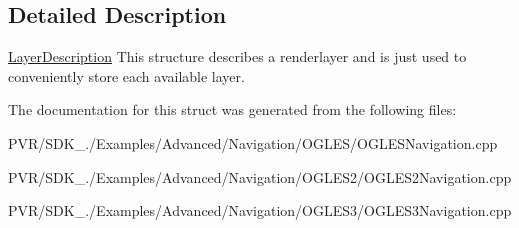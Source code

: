 \subsection{Detailed Description}


  \hyperlink{struct_layer_description}{Layer\+Description}  This structure describes a renderlayer and is just used to conveniently store each available layer. 

The documentation for this struct was generated from the following files\+:\begin{DoxyCompactItemize}
\item 
P\+V\+R/\+S\+D\+K\+\_./\+Examples/\+Advanced/\+Navigation/\+O\+G\+L\+E\+S/O\+G\+L\+E\+S\+Navigation.\+cpp\item 
P\+V\+R/\+S\+D\+K\+\_./\+Examples/\+Advanced/\+Navigation/\+O\+G\+L\+E\+S2/O\+G\+L\+E\+S2\+Navigation.\+cpp\item 
P\+V\+R/\+S\+D\+K\+\_./\+Examples/\+Advanced/\+Navigation/\+O\+G\+L\+E\+S3/O\+G\+L\+E\+S3\+Navigation.\+cpp\end{DoxyCompactItemize}
